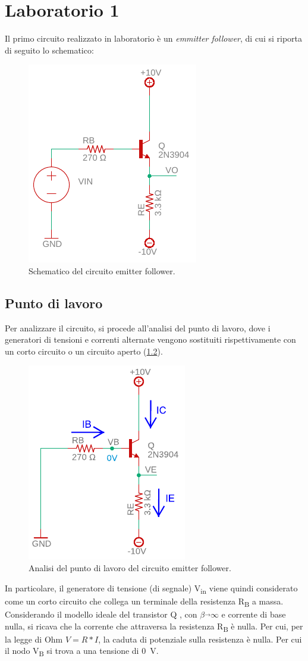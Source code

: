 \chapter{Laboratorio 1}
Il primo circuito realizzato in laboratorio è un \textit{emmitter follower}, di cui si riporta di seguito lo schematico:
\begin{figure}[h!]
	\centering
	\includegraphics[width=0.4\linewidth]{./OtherFiles/Laboratorio 1/emitter follower}
	\caption{Schematico del circuito emitter follower.}
	\label{fig:emitterfollwer}
\end{figure}
\section{Punto di lavoro}
Per analizzare il circuito, si procede all'analisi del punto di lavoro, dove i generatori di tensioni e correnti alternate vengono sostituiti rispettivamente con un corto circuito o un circuito aperto (\Fig\ref{fig:emitterfollwer_puntodilavoro}).
\begin{figure}[h!]
	\centering
	\includegraphics[width=0.4\linewidth]{./OtherFiles/Laboratorio 1/emitter follower_punto di lavoro_printout}
	\caption{Analisi del punto di lavoro del circuito emitter follower.}
	\label{fig:emitterfollwer_puntodilavoro}
\end{figure}
In particolare, il generatore di tensione (di segnale) V\textsubscript{in} viene quindi considerato come un corto circuito che collega un terminale della resistenza R\textsubscript{B} a massa. Considerando il modello ideale del transistor Q , con $\beta\overrightarrow{}\infty$ e corrente di base nulla, si ricava che la corrente che attraversa la resistenza R\textsubscript{B} è nulla. Per cui, per la legge di Ohm $V=R*I$, la caduta di potenziale sulla resistenza è nulla. Per cui il nodo V\textsubscript{B} si trova a una tensione di \SI{0}{\volt}. 

